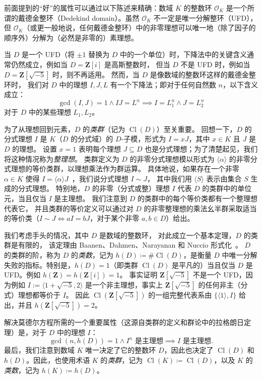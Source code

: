 \documentclass[sigplan,10pt,nonacm,
screen]{acmart} \settopmatter{printfolios=true,printccs=false,printacmref=false}
\newcommand{\ZZ}{\mathbf{Z}}
\newcommand{\OK}{\mathcal{O}_K}
\DeclareMathOperator{\Cl}{Cl}
\begin{document}
前面提到的“好”的属性可以通过以下陈述来精确：数域 $K$ 的整数环 $\OK$ 是一个所谓的戴德金整环（Dedekind domain）\cite[Section 2]{baanen_formalization_2021}。虽然 $\OK$ 不一定是唯一分解整环（UFD），但 $\OK$（或更一般地说，任何戴德金整环）中的非零理想可以唯一地（除了因子的顺序外）分解为（必然是非零的）素理想。

当 $D$ 是一个 UFD（将 $\pm 1$ 替换为 $D$ 中的一个单位）时，下降法中的关键含义通常仍然成立，例如当 $D=\ZZ[i]$ 是高斯整数时，
但当 $D$ 不是 UFD 时，例如当 $D=\ZZ[\sqrt{-5}]$ 时，则不再适用。
然而，当 $D$ 是像数域的整数环这样的戴德金整环时，
我们对 $D$ 中的理想 $I, J, L$ 有一个下降法；即对于任何自然数 $n$，以下含义成立：
\begin{equation}\label{eqn:Ideal_descent}
  \gcd(I,J)=1 \wedge I J=L^n \implies I=L_1^n \wedge J=L_2^n
\end{equation}
对于 $D$ 中的某些理想 $L_1, L_2$。

为了从理想回到元素，$D$ 的\emph{类群}（记为 $\Cl(D)$）至关重要。
回想一下，$D$ 的分式理想 $I$ 是 $K$（$D$ 的分式域）的 $D$-子模，形式为 $I=x J$，其中 $x \in K$ 且 $J$ 是 $D$ 的理想。
设置 $x = 1$ 表明每个理想 $J \subseteq D$ 也是分式理想；为了清楚起见，我们将这种情况称为\emph{整理想}。
类群定义为 $D$ 的非零分式理想模以形式为 $\langle \alpha \rangle$ 的非零分式理想的等价类群，以理想乘法作为群运算。
具体地说，如果存在一个非零 $\alpha \in K$ 使得 $ I = \langle \alpha \rangle J $~\cite[Section 2]{baanen_formalization_2021}，我们说分式理想 $I \sim J$，
其中我们用 $ \langle S \rangle$ 表示由集合 $S$ 生成的分式理想。
特别地，$D$ 的非零（分式或整）理想 $I$ 代表 $D$ 的类群中的单位元，当且仅当 $I$ 是主理想。
我们注意到 $D$ 的类群中的每个等价类都有一个整理想代表它，
并且类群的等价定义可以通过对 $D$ 的非零整理想的乘法幺半群采取适当的等价类（$I \sim J \Leftrightarrow aI=bJ$，对于某个非零 $a,b \in D$）给出。

我们考虑手头的情况，其中 $D$ 是数域的整数环，
对此成立一个基本定理，$D$ 的类群是有限的，
该定理由 Baanen、Dahmen、Narayanan 和 Nuccio 形式化~\cite{baanen_formalization_2021}。
$D$ 的类群的阶，称为 $D$ 的\emph{类数}，记为 $h(D)\coloneqq\#\Cl(D)$，是衡量 $D$ 中唯一分解失败的指标。特别是，$h(D)=1$（即类群 $\Cl(D)$ 是平凡的）当且仅当 $D$ 是 UFD。例如 $h(\ZZ)=h(\ZZ[i])=1$。
事实证明 $\ZZ[\sqrt{-5}]$ 不是一个 UFD，因为例如 $I:=\langle 1+\sqrt{-5},2\rangle$ 是一个非主理想，事实上 $\ZZ[\sqrt{-5}]$ 的任何非主（分式）理想都等价于 $I$。
因此 $\Cl(\ZZ[\sqrt{-5}])$ 的一组完整代表系由 $\{\langle 1 \rangle,I\}$ 给出，并且 $h(\ZZ[\sqrt{-5}])=2$。

解决莫德尔方程所需的一个重要属性（这源自类群的定义和群论中的拉格朗日定理）是，对于 $D$ 中的理想 $I$：
\begin{equation}\label{eqn:principality_from_power}
 \gcd(n,h(D))=1 \wedge I^n \text{ 是主理想} \implies I \text{ 是主理想}.
\end{equation}
最后，我们注意到数域 $K$ 唯一决定了它的整数环 $D$，因此也决定了 $\Cl(D)$ 和 $h(D)$。因此，也使用术语 $K$ 的\emph{类群}，记为 $\Cl(K)\coloneqq\Cl(D)$，以及 $K$ 的\emph{类数}，记为 $h(K)\coloneqq h(D)$。
\end{document}
